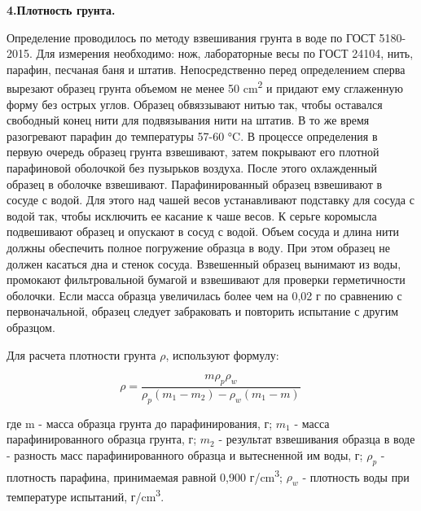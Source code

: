 \textbf{4.Плотность грунта.}

Определение проводилось по методу взвешивания грунта в воде по ГОСТ 5180-2015. Для измерения необходимо:
нож, лабораторные весы по ГОСТ 24104, нить, парафин, песчаная баня и штатив. Непосредственно перед 
определением сперва вырезают образец грунта объемом не менее 50 \si{\centi\meter^2} и придают ему сглаженную 
форму без острых углов. Образец обвяззывают нитью так, чтобы оставался свободный конец нити для 
подвязывания нити на штатив. В то же время разогревают парафин до температуры 57-60 \si{\degreeCelsius}.
В процессе определения в первую очередь образец грунта взвешивают, затем покрывают его плотной 
парафиновой оболочкой без пузырьков воздуха. После этого охлажденный образец в оболочке взвешивают. 
Парафинированный образец взвешивают в сосуде с водой.
Для этого над чашей весов устанавливают подставку для сосуда с водой так,
чтобы исключить ее касание к чаше весов. К серьге коромысла
подвешивают образец и опускают в сосуд с водой. Объем сосуда и длина
нити должны обеспечить полное погружение образца в воду. При этом
образец не должен касаться дна и стенок сосуда.
Взвешенный образец вынимают из воды, промокают
фильтровальной бумагой и взвешивают для проверки герметичности
оболочки. Если масса образца увеличилась более чем на 0,02 г по сравнению
с первоначальной, образец следует забраковать и повторить испытание с
другим образцом.

Для расчета плотности грунта  $\rho$,  используют формулу: 

\[
   \rho = \frac{m \rho_p \rho_w}{\rho_p (m_1-m_2)-\rho_w (m_1-m)}\
\]

где m - масса образца грунта до парафинирования, г;
$m_1$ - масса парафинированного образца грунта, г;
$m_2$ - результат взвешивания образца в воде - разность масс
парафинированного образца и вытесненной им воды, г; 
$\rho_p$ - плотность парафина, принимаемая равной 0,900 г/\si{\centi\meter^3};
$\rho_w$ - плотность воды при температуре испытаний,  г/\si{\centi\meter^3}.